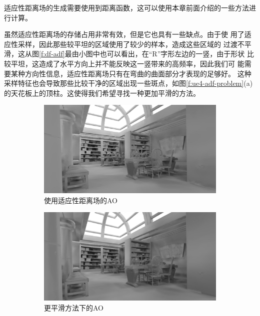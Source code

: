 适应性距离场的生成需要使用到距离函数，这可以使用本章前面介绍的一些方法进行计算。

虽然适应性距离场的存储占用非常有效，但是它也具有一些缺点。由于使 用了适应性采样，因此那些较平坦的区域使用了较少的样本，造成这些区域的 过渡不平滑，这从图\ref{f:df-adf}最由小图中也可以看出，在“R”字形左边的一竖，由于形状 比较平坦，这造成了水平方向上并不能反映这一竖带来的高频率，因此我们可 能需要某种方向性信息，适应性距离场只有在弯曲的曲面部分才表现的足够好。 这种采样特征也会导致那些比较干净的区域出现一些斑点，如图\ref{f:ue4-adf-problem}(a)的天花板上的顶柱。这使得我们希望寻找一种更加平滑的方法。

\begin{figure}
\begin{fullwidth}
	\begin{subfigure}[b]{0.5\thewidth}
		\includegraphics[width=\textwidth]{figures/df/DFAO_View_OldMethod}
		\caption{使用适应性距离场的AO}
	\end{subfigure}
	\begin{subfigure}[b]{0.5\thewidth}
		\includegraphics[width=\textwidth]{figures/df/DFAO_View_NewMethod}
		\caption{更平滑方法下的AO}
	\end{subfigure}
	\begin{subfigure}[b]{0.5\thewidth}

\end{subfigure}
\end{fullwidth}
\end{figure}
